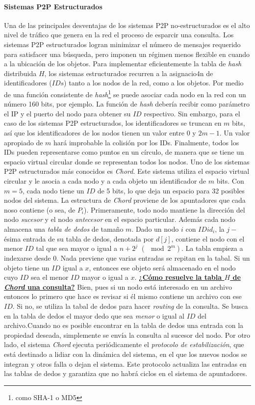 \paragraph{\textnormal{\textbf{Sistemas P2P Estructurados}}}
Una de las principales desventajas de los sistemas P2P no-estructurados es el alto nivel de tráfico que genera en la red el proceso de esparcir una consulta. Los sistemas P2P estructurados logran minimizar el número de mensajes requerido para satisfacer una búsqueda, pero imponen un régimen menos flexible en cuando a la ubicación de los objetos. Para implementar eficientemente la tabla de \emph{hash} distribuida $H$, los sistemas estructurados recurren a la asignacio4n de identificadores ($IDs$) tanto a los nodos de la red, como a los objetos. Por medio de una función consistente de \emph{hash}\footnote{como SHA-1 o MD5} se puede asociar cada nodo en la red con un número 160 bits, por ejemplo. La función de \emph{hash} debería recibir como parámetro el IP y el puerto del nodo para obtener su $ID$ respectivo. Sin embargo, para el caso de los sistemas P2P estructurados, los identificadores se truncan en $m$ bits, así que los identificadores de los nodos tienen un valor entre $0$ y $2m - 1$. Un valor apropiado de $m$ hará improbable la colisión por los IDs. Finalmente, todos los IDs pueden representarse como puntos en un círculo, de manera que se tiene un espacio virtual circular donde se representan todos los nodos. Uno de los sistemas P2P estructurados más conocidos es \emph{Chord}. Este sistema utiliza el espacio virtual circular y le asocia a cada nodo y a cada objeto un identificador de $m$ bits. Con $m = 5$, cada nodo tiene un $ID$ de 5 bits, lo que deja un espacio para 32 posibles nodos del sistema. La estructura de \emph{Chord} proviene de los apuntadores que cada noso contiene (o sea, de $P_i$). Primeramente, todo nodo mantiene la dirección del nodo \emph{sucesor} y el nodo \emph{antecesor} en el espacio particular. Además cada nodo almacena una \emph{tabla de dedos} de tamaño $m$. Dado un nodo $i$ con $ID id_i$, la $j-$ésima entrada de su tabla de dedos, denotada por $d[j]$, contiene el nodo con el menor $ID$ tal que sea mayor o igual a $n + 2^j$ $(\mod 2^m)$. La tabla empieza a indexarse desde 0. Nada previene que varias entradas se repitan en la tabal. Si un objeto tiene un $ID$ igual a $x$, entonces ese objeto será almacenado en el nodo cuyo $ID$ sea el menor $ID$ mayor o igual a $x$.  \underline{\textbf{¿Cómo resuelve la tabla $H$ de \emph{Chord} una consulta?}} Bien, pues si un nodo está interesado en un archivo entonces lo primero que hace es revisar si él mismo contiene un archivo con ese $ID$. Si no, se utiliza la tabal de dedos para hacer \emph{routing} de la consulta. Se busca en la tabla de dedos el mayor dedo que sea \emph{menor} o igual al $ID$ del archivo.Cuando no es posible encontrar en la tabla de dedos una entrada con la propiedad deseada, simplemente se envía la consulta al sucesor del nodo. Por otro lado, el sistema \emph{Chord} ejecuta periódicamente el \emph{protocolo de estabilización}, que está destinado a lidiar con la dinámica del sistema, en el que los nuevos nodos se integran y otros falla o dejan el sistema. Este protocolo actualiza las entradas en las tablas de dedos y garantiza que no habrá ciclos en el sistema de apuntadores.

